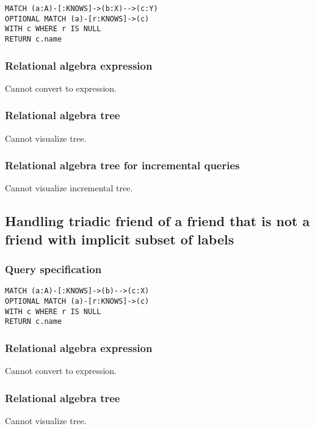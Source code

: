 \begin{lstlisting}
MATCH (a:A)-[:KNOWS]->(b:X)-->(c:Y)
OPTIONAL MATCH (a)-[r:KNOWS]->(c)
WITH c WHERE r IS NULL
RETURN c.name
\end{lstlisting}

\subsubsection*{Relational algebra expression}

Cannot convert to expression.

\subsubsection*{Relational algebra tree}

Cannot visualize tree.

\subsubsection*{Relational algebra tree for incremental queries}

Cannot visualize incremental tree.

\subsection{Handling triadic friend of a friend that is not a friend with implicit subset of labels}

\subsubsection*{Query specification}

\begin{lstlisting}
MATCH (a:A)-[:KNOWS]->(b)-->(c:X)
OPTIONAL MATCH (a)-[r:KNOWS]->(c)
WITH c WHERE r IS NULL
RETURN c.name
\end{lstlisting}

\subsubsection*{Relational algebra expression}

Cannot convert to expression.

\subsubsection*{Relational algebra tree}

Cannot visualize tree.

